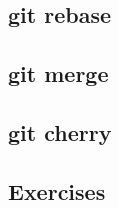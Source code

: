\subsection{git rebase}
\begin{frame}[fragile]
    \subslidetitle
\end{frame}

\subsection{git merge}
\begin{frame}[fragile]
    \subslidetitle
\end{frame}

\subsection{git cherry}
\begin{frame}[fragile]
    \subslidetitle
\end{frame}

\subsection{Exercises}
\begin{frame}[fragile]
  \subslidetitle
\end{frame}
